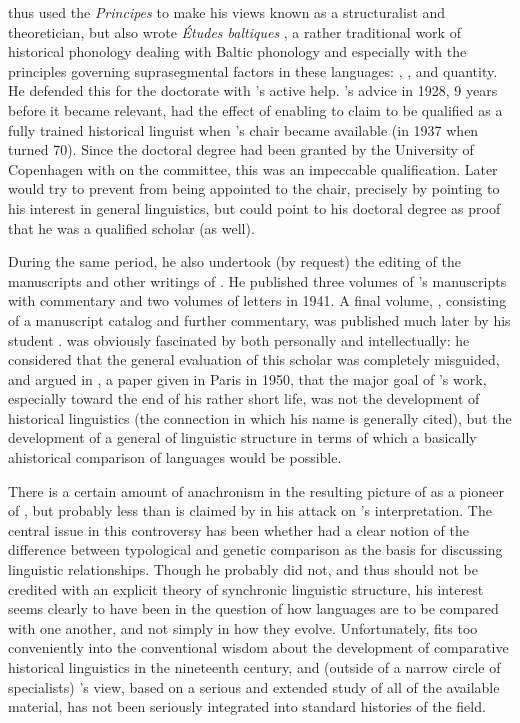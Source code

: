 {\Hjelmslev} thus used the \textsl{Principes} to make his views known as
a structuralist and theoretician, but also wrote \textsl{Études
  baltiques} \citep{hjelmslev32:thesis}, a rather traditional work of
historical phonology dealing with Baltic phonology and especially with
the principles governing suprasegmental factors in these languages:
, , and quantity. He defended this for the doctorate with
{\Pedersen}'s active help.  {\Pedersen}'s advice in 1928, 9 years before it
became relevant, had the effect of enabling {\Hjelmslev} to claim to be
qualified as a fully trained historical linguist when {\Pedersen}'s chair
became available (in 1937 when {\Pedersen} turned 70). Since the doctoral
degree had been granted by the University of Copenhagen with {\Pedersen}
on the committee, this was an impeccable qualification. Later 
 would try to prevent {\Hjelmslev} from being appointed to the
chair, precisely by pointing to his interest in general linguistics,
but {\Pedersen} could point to his doctoral degree as proof that he was a
qualified  scholar (as well).

During the same period, he also undertook (by request) the editing of
the manuscripts and other writings of . He published three
volumes of {\Rask}'s manuscripts \citep{hjelmslev:rask} with commentary
and two volumes of letters in 1941. A final volume,
\citet{bjerrum68:rask}, consisting of a manuscript catalog and further
commentary, was published much later by his student . 
{\Hjelmslev} was obviously fascinated by {\Rask} both personally
and intellectually: he considered that the general evaluation of this
scholar was completely misguided, and argued in
\citet{hjelmslev:rask.comentaire}, a paper given in Paris in 1950,
that the major goal of {\Rask}'s work, especially toward the end of his
rather short life, was not the development of historical linguistics
(the connection in which his name is generally cited), but the
development of a general  of linguistic structure in terms of
which a basically ahistorical comparison of languages would be
possible.

There is a certain amount of anachronism in the resulting picture of
{\Rask} as a pioneer of , but probably less than is claimed
by \citet{diderichsen60:rask} in his attack on {\Hjelmslev}'s
interpretation. The central issue in this controversy has been whether
{\Rask} had a clear notion of the difference between typological and
genetic comparison as the basis for discussing linguistic
relationships. Though he probably did not, and thus should not be
credited with an explicit theory of synchronic linguistic structure,
his interest seems clearly to have been in the question of how
languages are to be compared with one another, and not simply in how
they evolve. Unfortunately, {\Rask} fits too conveniently into the
conventional wisdom about the development of comparative historical
linguistics in the nineteenth century, and (outside of a narrow circle
of specialists) {\Hjelmslev}'s view, based on a serious and extended
study of all of the available material, has not been seriously
integrated into standard histories of the field.

